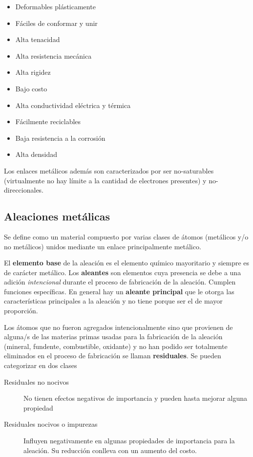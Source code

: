 \begin{itemize}
    \item Deformables plásticamente
    \item Fáciles de conformar y unir
    \item Alta tenacidad
    \item Alta resistencia mecánica
    \item Alta rigidez
    \item Bajo costo
    \item Alta conductividad eléctrica y térmica
    \item Fácilmente reciclables
    \item Baja resistencia a la corrosión
    \item Alta densidad
\end{itemize}

Los enlaces metálicos además son caracterizados por ser no-saturables (virtualmente no hay límite a la cantidad de electrones presentes) y no-direccionales.


\subsection{Aleaciones metálicas}

Se define como un material compuesto por varias clases de átomos (metálicos y/o no metálicos) unidos mediante un enlace principalmente metálico.

El \textbf{elemento base} de la aleación es el elemento químico mayoritario y siempre es de carácter metálico. Los \textbf{aleantes} son elementos cuya presencia se debe a una adición \textit{intencional} durante el proceso de fabricación de la aleación. Cumplen funciones específicas. En general hay un \textbf{aleante principal} que le otorga las características principales a la aleación y no tiene porque ser el de mayor proporción.

Los átomos que no fueron agregados intencionalmente sino que provienen de alguna/s de las materias primas usadas para la fabricación de la aleación (mineral, fundente, combustible, oxidante) y no han podido ser totalmente eliminados en el proceso de fabricación se llaman \textbf{residuales}. Se pueden categorizar en dos clases

\begin{description}
    \item[Residuales no nocivos] No tienen efectos negativos de importancia y pueden hasta mejorar alguna propiedad
    \item[Residuales nocivos o impurezas] Influyen negativamente en algunas propiedades de importancia para la aleación. Su reducción conlleva con un aumento del costo.  
\end{description}

